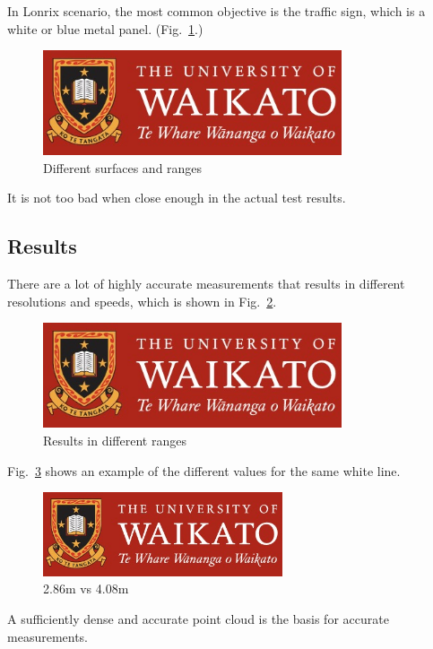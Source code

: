  
In Lonrix scenario, the most common objective is the traffic sign, which is a white or blue metal panel. (Fig.~\ref{fig2c}.)

\begin{figure}[htbp]
  \centerline{\includegraphics[width=250pt]{images/UoW.jpg}}
  \caption{Different surfaces and ranges}
  \label{fig2c}
\end{figure}


It is not too bad when close enough in the actual test results.

\subsection{Results}

There are a lot of highly accurate measurements that results in different resolutions and speeds, which is shown in Fig.~\ref{fig2d}. 
 
\begin{figure}[htbp]
  \centerline{\includegraphics[width=250pt]{images/UoW.jpg}}
  \caption{Results in different ranges}
  \label{fig2d}
\end{figure}

Fig.~\ref{fig2d2} shows an example of the different values for the same white line.
\begin{figure}[htbp]
  \centerline{\includegraphics[width=200pt]{images/UoW.jpg}}
  \caption{2.86m vs 4.08m}
  \label{fig2d2}
\end{figure}

A sufficiently dense and accurate point cloud is the basis for accurate measurements.

